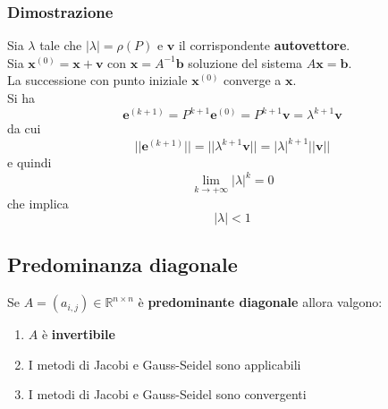 \subsubsection{Dimostrazione}
Sia $\lambda$ tale che $\lvert \lambda \rvert = \rho(P)$ e $\mathbf{v}$ il corrispondente \textbf{autovettore}.\\
Sia $\mathbf{x}^{(0)} = \mathbf{x} + \mathbf{v}$ con $\mathbf{x} = A^{-1} \mathbf{b}$ soluzione del sistema $A\mathbf{x} = \mathbf{b}$.\\
La successione con punto iniziale $\mathbf{x}^{(0)}$ converge a $\mathbf{x}$.\\
Si ha
\begin{equation*}
	\mathbf{e}^{(k+1)} = P^{k+1}\mathbf{e}^{(0)} = P^{k+1}\mathbf{v} = \lambda^{k+1}\mathbf{v}
\end{equation*}
da cui
\begin{equation*}
	\lvert\lvert \mathbf{e}^{(k+1)} \rvert\rvert = \lvert\lvert \lambda^{k+1}\mathbf{v} \rvert\rvert = \lvert \lambda\rvert^{k+1} \lvert\lvert \mathbf{v} \rvert\rvert
\end{equation*}
e quindi
\begin{equation*}
	\lim_{k \to +\infty} \lvert \lambda \rvert ^k = 0
\end{equation*}
che implica
\begin{equation*}
	\lvert \lambda \rvert < 1
\end{equation*}

\subsection{Predominanza diagonale}
\begin{theorem}
	Se $A = (a_{i,j}) \in \mathbb{R}^{n \times n}$ è \textbf{predominante diagonale} allora valgono:
	\begin{enumerate}
		\item $A$ è \textbf{invertibile}
		\item I metodi di Jacobi e Gauss-Seidel sono applicabili
		\item I metodi di Jacobi e Gauss-Seidel sono convergenti
	\end{enumerate}
\end{theorem}

